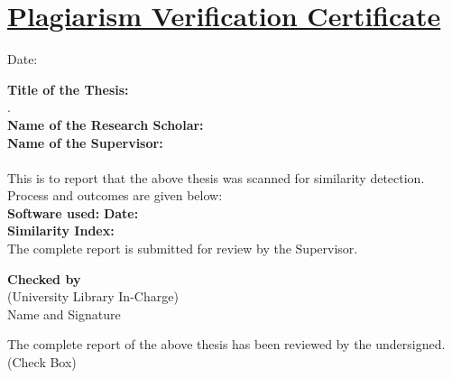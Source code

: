 \chapter*{\uline{Plagiarism Verification Certificate}}

\begin{flushright} 
Date: \underline{\hspace{3cm}} 
\end{flushright} 
\vspace{.1cm} 
\noindent 
\textbf{Title of the Thesis:} \\ \Titel .\\ 
\vspace{.1cm} 
\noindent 
\textbf{Name of the Research Scholar: }\sAuthor \\ 
\vspace{0.1cm} 
\noindent 
\textbf{Name of the Supervisor: }\Supervisor \\ 
\vspace{0.1cm} \noindent 
\textbf{\Department} \\ 
\vspace{.1cm} 
\noindent 
\justifying
This is to report that the above thesis was scanned for similarity detection. Process and outcomes are given below:\\ \vspace{0.1cm} 
\noindent 
\textbf{Software used:} 
\underline{\hspace{5cm}} 
\hfill \textbf{Date:} \underline{\hspace{5cm}} \\ \vspace{0.1cm} 
\noindent \textbf{Similarity Index:} \underline{\hspace{5cm}} \\ \vspace{0.1cm} 
\noindent 
The complete report is submitted for review by the Supervisor. 
\vspace{.1cm} 
\noindent 
\begin{flushright} 
\textbf{Checked by} \\ 
(University Library In-Charge) \\ 
Name and Signature \\ 
\underline{\hspace{5cm}} 
\end{flushright} 
\noindent 
The complete report of the above thesis has been reviewed by the undersigned. (Check Box) 
